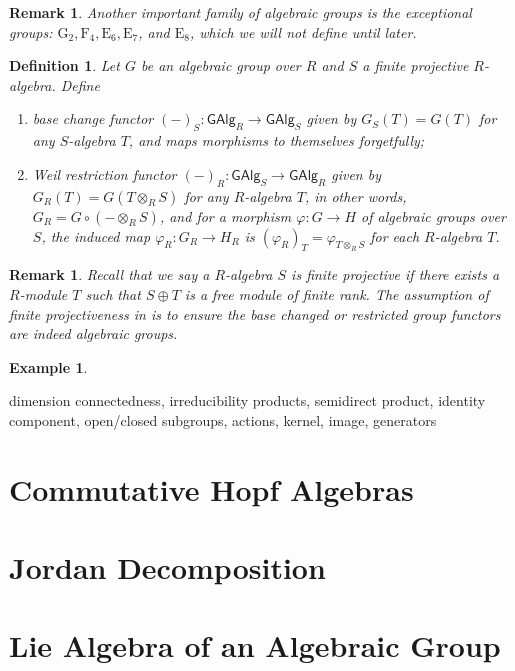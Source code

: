 \documentclass[10pt]{book}
\theoremstyle{bookplain}
\theoremstyle{bookdefinition}
\newtheorem{definition}[theorem]{Definition}
\newtheorem{example}[theorem]{Example}
\theoremstyle{bookremark}
\newtheorem{remark}[theorem]{Remark}
\begin{document}
\begin{remark}Another important family of algebraic groups is the \textit{exceptional groups}: $\mathrm G_2, \mathrm F_4, \mathrm E_6, \mathrm E_7$, and $\mathrm E_8$, which we will not define until later. 
\end{remark}
\begin{definition}
    \label{def:base}
    Let $G$ be an algebraic group over $R$ and $S$ a finite projective $R$-algebra. Define
    \begin{enumerate}
        \item \textit{base change functor} $(-)_S:\mathsf{GAlg}_R\rightarrow \mathsf{GAlg}_S$ given by $G_S(T)=G(T)$ for any $S$-algebra $T$, and maps morphisms to themselves forgetfully;
        \item \textit{Weil restriction functor} $(-)_R:\mathsf{GAlg}_S\rightarrow \mathsf{GAlg}_R$ given by $G_R(T)=G(T\otimes_R S)$ for any $R$-algebra $T$, in other words, $G_R=G\circ (-\otimes_R S)$, and for a morphism $\varphi:G\rightarrow H$ of algebraic groups over $S$, the induced map $\varphi_R:G_R\rightarrow H_R$ is $(\varphi_R)_T=\varphi_{T\otimes_R S}$ for each $R$-algebra $T$. 
    \end{enumerate}
\end{definition}
\begin{remark}Recall that we say a $R$-algebra $S$ is finite projective if there exists a $R$-module $T$ such that $S\oplus T$ is a free module of finite rank. The assumption of finite projectiveness in  is to ensure the base changed or restricted group functors are indeed algebraic groups. 
\end{remark}
\begin{example}
\end{example}


\newpage 


dimension
connectedness, irreducibility
products, semidirect product, identity component, open/closed subgroups, actions, kernel, image, generators

\section{Commutative Hopf Algebras}

\section{Jordan Decomposition}

\section{Lie Algebra of an Algebraic Group}
\end{document}
